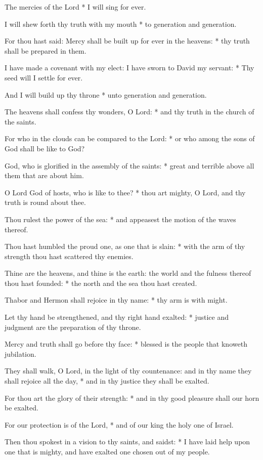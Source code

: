﻿\item The mercies of the Lord * I will sing for ever.
\item I will shew forth thy truth with my mouth * to generation and generation.
\item For thou hast said: Mercy shall be built up for ever in the heavens: * thy truth shall be prepared in them.
\item I have made a covenant with my elect: I have sworn to David my servant: * Thy seed will I settle for ever.
\item And I will build up thy throne * unto generation and generation.
\item The heavens shall confess thy wonders, O Lord: * and thy truth in the church of the saints.
\item For who in the clouds can be compared to the Lord: * or who among the sons of God shall be like to God?
\item God, who is glorified in the assembly of the saints: * great and terrible above all them that are about him.
\item O Lord God of hosts, who is like to thee? * thou art mighty, O Lord, and thy truth is round about thee.
\item Thou rulest the power of the sea: * and appeasest the motion of the waves thereof.
\item Thou hast humbled the proud one, as one that is slain: * with the arm of thy strength thou hast scattered thy enemies.
\item Thine are the heavens, and thine is the earth: the world and the fulness thereof thou hast founded: * the north and the sea thou hast created.
\item Thabor and Hermon shall rejoice in thy name: * thy arm is with might.
\item Let thy hand be strengthened, and thy right hand exalted: * justice and judgment are the preparation of thy throne.
\item Mercy and truth shall go before thy face: * blessed is the people that knoweth jubilation.
\item They shall walk, O Lord, in the light of thy countenance: and in thy name they shall rejoice all the day, * and in thy justice they shall be exalted.
\item For thou art the glory of their strength: * and in thy good pleasure shall our horn be exalted.
\item For our protection is of the Lord, * and of our king the holy one of Israel.
\item Then thou spokest in a vision to thy saints, and saidst: * I have laid help upon one that is mighty, and have exalted one chosen out of my people. 
